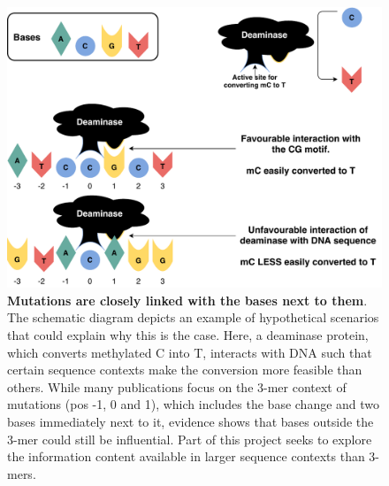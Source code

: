\begin{figure}[h!]
    \centering
    \includegraphics[scale=0.78]{graphics/motif_demo.pdf}
    \caption{\textbf{Mutations are closely linked with the bases next to them}. The schematic diagram depicts an example of hypothetical scenarios that could explain why this is the case. Here, a deaminase protein, which converts methylated C into T, interacts with DNA such that certain sequence contexts make the conversion more feasible than others. While many publications focus on the 3-mer context of mutations (pos -1, 0 and 1), which includes the base change and two bases immediately next to it, evidence shows that bases outside the 3-mer could still be influential. Part of this project seeks to explore the information content available in larger sequence contexts than 3-mers.}
    \label{fig:motif_demo}
\end{figure}

